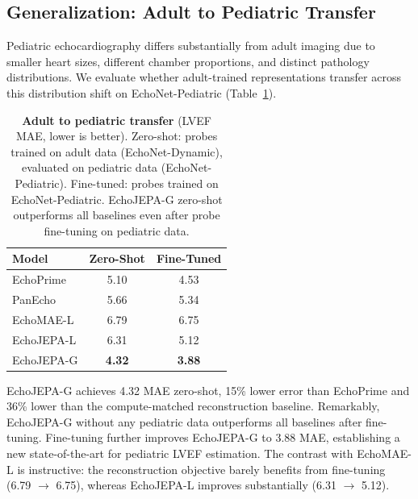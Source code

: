 \documentclass{article}
\theoremstyle{plain}
\theoremstyle{definition}
\theoremstyle{remark}
\begin{document}
\subsection{Generalization: Adult to Pediatric Transfer}
\label{sec:exp:pediatric}

Pediatric echocardiography differs substantially from adult imaging due to smaller heart sizes, different chamber proportions, and distinct pathology distributions. We evaluate whether adult-trained representations transfer across this distribution shift on EchoNet-Pediatric (Table~\ref{tab:pediatric}).

\begin{table}[h]
    \centering
\caption{\textbf{Adult to pediatric transfer} (LVEF MAE, lower is better). 
Zero-shot: probes trained on adult data (EchoNet-Dynamic), evaluated on 
pediatric data (EchoNet-Pediatric). Fine-tuned: probes trained on 
EchoNet-Pediatric. EchoJEPA-G zero-shot outperforms all baselines even 
after probe fine-tuning on pediatric data.}
    \label{tab:pediatric}
    \vspace{0.5em}
    \small
    \begin{tabular}{@{}lcc@{}}
        \toprule
        \textbf{Model} & \textbf{Zero-Shot} & \textbf{Fine-Tuned} \\
        \midrule
        EchoPrime & 5.10 & 4.53 \\
        PanEcho & 5.66 & 5.34 \\
        \midrule
        EchoMAE-L & 6.79 & 6.75 \\
        EchoJEPA-L & 6.31 & 5.12 \\
        EchoJEPA-G & \textbf{4.32} & \textbf{3.88} \\
        \bottomrule
    \end{tabular}
\end{table}

EchoJEPA-G achieves 4.32 MAE zero-shot, 15\% lower error than EchoPrime and 36\% lower than the compute-matched reconstruction baseline. Remarkably, EchoJEPA-G without any pediatric data outperforms all baselines after fine-tuning. Fine-tuning further improves EchoJEPA-G to 3.88 MAE, establishing a new state-of-the-art for pediatric LVEF estimation. The contrast with EchoMAE-L is instructive: the reconstruction objective barely benefits from fine-tuning (6.79 $\to$ 6.75), whereas EchoJEPA-L improves substantially (6.31 $\to$ 5.12).
\end{document}

